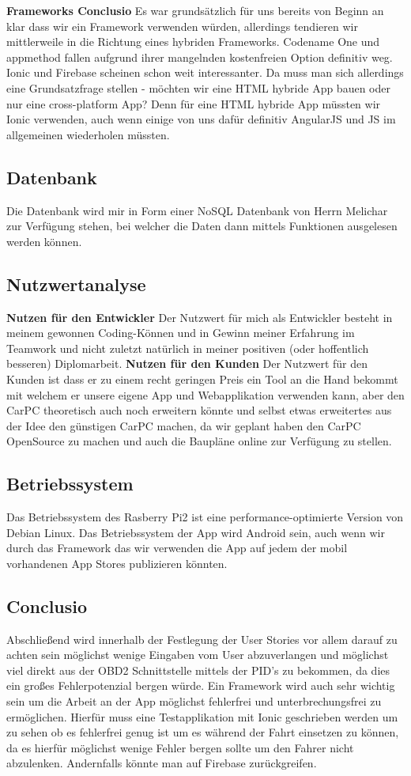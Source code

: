 \textbf{Frameworks Conclusio}
Es war grundsätzlich für uns bereits von Beginn an klar dass wir ein Framework verwenden würden, allerdings tendieren wir mittlerweile in die Richtung eines hybriden Frameworks. Codename One und appmethod fallen aufgrund ihrer mangelnden kostenfreien Option definitiv weg. Ionic und Firebase scheinen schon weit interessanter.
Da muss man sich allerdings eine Grundsatzfrage stellen - möchten wir eine HTML hybride App bauen oder nur eine cross-platform App? Denn für eine HTML hybride App müssten wir Ionic verwenden, auch wenn einige von uns dafür definitiv AngularJS und JS im allgemeinen wiederholen müssten.


\subsection {Datenbank}
Die Datenbank wird mir in Form einer NoSQL Datenbank von Herrn Melichar zur Verfügung stehen, bei welcher die Daten dann mittels Funktionen ausgelesen werden können. 


\subsection {Nutzwertanalyse}
\textbf{Nutzen für den Entwickler}
Der Nutzwert für mich als Entwickler besteht in meinem gewonnen Coding-Können und in Gewinn meiner Erfahrung im Teamwork und nicht zuletzt natürlich in meiner positiven (oder hoffentlich besseren) Diplomarbeit.
\textbf{Nutzen für den Kunden}
Der Nutzwert für den Kunden ist dass er zu einem recht geringen Preis ein Tool an die Hand bekommt mit welchem er unsere eigene App und Webapplikation verwenden kann, aber den CarPC theoretisch auch noch erweitern könnte und selbst etwas erweitertes aus der Idee den günstigen CarPC machen, da wir geplant haben den CarPC OpenSource zu machen und auch die Baupläne online zur Verfügung zu stellen. 


\subsection {Betriebssystem}
Das Betriebssystem des Rasberry Pi2 ist eine performance-optimierte Version von Debian Linux.
Das Betriebssystem der App wird Android sein, auch wenn wir durch das Framework das wir verwenden die App auf jedem der mobil vorhandenen App Stores publizieren könnten.


\subsection {Conclusio}
Abschließend wird innerhalb der Festlegung der User Stories vor allem darauf zu achten sein möglichst wenige Eingaben vom User abzuverlangen und möglichst viel direkt aus der OBD2 Schnittstelle mittels der PID's zu bekommen, da dies ein großes Fehlerpotenzial bergen würde. 
Ein Framework wird auch sehr wichtig sein um die Arbeit an der App möglichst fehlerfrei und unterbrechungsfrei zu ermöglichen. Hierfür muss eine Testapplikation mit Ionic geschrieben werden um zu sehen ob es fehlerfrei genug ist um es während der Fahrt einsetzen zu können, da es hierfür möglichst wenige Fehler bergen sollte um den Fahrer nicht abzulenken. Andernfalls könnte man auf Firebase zurückgreifen.
